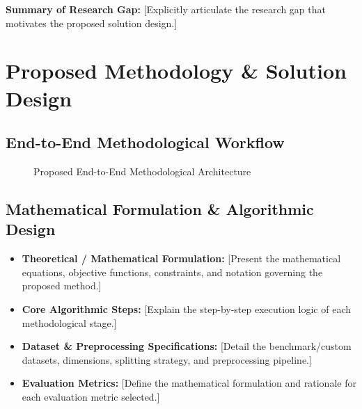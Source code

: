 \documentclass[11pt, a4paper]{article}
\begin{document}
\noindent
\textbf{Summary of Research Gap:} {[Explicitly articulate the research gap that motivates the proposed solution design.]}

\section{Proposed Methodology \& Solution Design}

\subsection{End-to-End Methodological Workflow}

\begin{figure}[H]
    \centering
    \caption{Proposed End-to-End Methodological Architecture}
\end{figure}

\subsection{Mathematical Formulation \& Algorithmic Design}
\begin{itemize}[noitemsep, topsep=2pt]
    \item \textbf{Theoretical / Mathematical Formulation:} {[Present the mathematical equations, objective functions, constraints, and notation governing the proposed method.]}
    \item \textbf{Core Algorithmic Steps:} {[Explain the step-by-step execution logic of each methodological stage.]}
    \item \textbf{Dataset \& Preprocessing Specifications:} {[Detail the benchmark/custom datasets, dimensions, splitting strategy, and preprocessing pipeline.]}
    \item \textbf{Evaluation Metrics:} {[Define the mathematical formulation and rationale for each evaluation metric selected.]}
\end{itemize}
\end{document}

